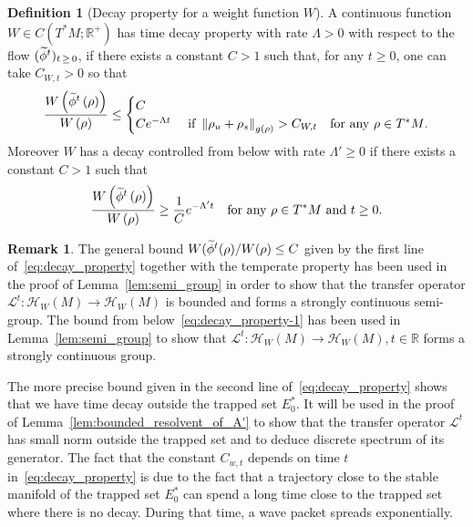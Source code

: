 \documentclass[10pt]{amsart}
\theoremstyle{definition}\newtheorem{defi}[theo]{Definition}\newtheorem{rema}[theo]{Remark}\newtheorem{exam}[theo]{Example}\newtheorem{exem}[theo]{Example}\newtheorem{nota}[theo]{Notation}
\newcommand{\clH}{\mathcal{H}}
\newcommand{\clL}{\mathcal{L}}
\newcommand{\bbR}{\mathbb{R}}
\let\oldtilde\tilde
\renewcommand*{\tilde}[1]{\mathchoice{\widetilde{#1}}{\widetilde{#1}}{\oldtilde{#1}}{\oldtilde{#1}}}
\begin{document}
\begin{cBoxA}{}
\begin{defi}[Decay property for a weight function $W$]\label{def:decay_W}
A continuous function $W\in C(T^{*}M;\bbR^{+})$ has time decay property with rate $\Lambda>0$ with respect to the flow $(\tilde{\phi}^{t})_{t\,\geq\,0}$, if there exists a constant $C>1$ such that, for any $t\geq0$, one can take $C_{W,t}>0$ so that
\begin{equation}\label{eq:decay_property}
\frac{W\left(\tilde{\phi}^{t}\left(\rho\right)\right)}{W\left(\rho\right)}\leq
\begin{cases}
C\\
Ce^{-\Lambda t} & \text{ if }\left\Vert \rho_{u}+\rho_{s}\right\Vert _{g\left(\rho\right)}>C_{W,t}\quad\text{for any \ensuremath{\rho\in T^{*}M}.}
\end{cases}
\end{equation}
Moreover $W$ has a decay controlled from below with rate $\Lambda'\geq0$ if there exists a constant $C>1$ such that
\begin{equation}\label{eq:decay_property-1}
\frac{W\left(\tilde{\phi}^{t}\left(\rho\right)\right)}{W\left(\rho\right)}\geq\frac{1}{C}e^{-\Lambda't} \quad\text{for any \ensuremath{\rho\in T^{*}M}\text{ and }\ensuremath{t\ge0}}.
\end{equation}
\end{defi}
\end{cBoxA}

\begin{rema}
The general bound $W(\tilde{\phi}^{t}(\rho)/W(\rho)\leq C$ given by the first line of~\eqref{eq:decay_property} together with the temperate property has been used in the proof of Lemma~\ref{lem:semi_group} in order to show that the transfer operator $\clL^{t}:\clH _{W}(M)\rightarrow\clH _{W}(M)$ is bounded and forms a strongly continuous semi-group. The bound from below~\eqref{eq:decay_property-1} has been used in Lemma~\ref{lem:semi_group} to show that $\clL^{t}:\clH _{W}(M)\rightarrow\clH _{W}(M),t\in\bbR$ forms a strongly continuous group.

The more precise bound given in the second line of~\eqref{eq:decay_property} shows that we have time decay outside the trapped set $E_{0}^{*}$. It will be used in the proof of Lemma~\ref{lem:bounded_resolvent_of_A'} to show that the transfer operator $\clL^{t}$ has small norm outside the trapped set and to deduce discrete spectrum of its generator. The fact that the constant $C_{w,t}$ depends on time $t$ in~\eqref{eq:decay_property} is due to the fact that a trajectory close to the stable manifold of the trapped set $E_{0}^{*}$ can spend a long time close to the trapped set where there is no decay. During that time, a wave packet spreads exponentially.
\end{rema}
\end{document}
